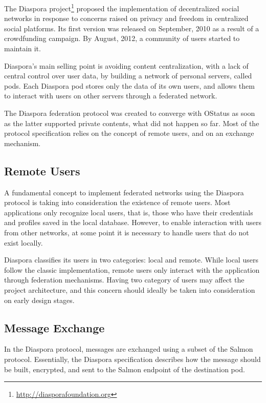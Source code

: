 The Diaspora project\footnote{\url{http://diasporafoundation.org}} proposed the
implementation of decentralized social networks in response to concerns raised
on privacy and freedom in centralized social platforms. Its first version was
released on September, 2010 as a result of a crowdfunding campaign. By August,
2012, a community of users started to maintain it.

Diaspora's main selling point is avoiding content centralization, with a lack
of central control over user data, by building a network of personal servers,
called pods. Each Diaspora pod stores only the data of its own users, and
allows them to interact with users on other servers through a federated
network.

The Diaspora federation protocol was created to converge with OStatus as
soon as the latter supported private contents, what did not happen so
far. Most of the protocol specification relies on the concept of remote
users, and on an exchange mechanism.

\subsection{Remote Users}

A fundamental concept to implement federated networks using the Diaspora
protocol is taking into consideration the existence of remote users.
Most applications only recognize local users, that is, those who have
their credentials and profiles saved in the local database. However, to
enable interaction with users from other networks, at some point it is
necessary to handle users that do not exist locally.

Diaspora classifies its users in two categories: local and remote. While
local users follow the classic implementation, remote users only
interact with the application through federation mechanisms. Having two
category of users may affect the project architecture, and this concern
should ideally be taken into consideration on early design stages.

\subsection{Message Exchange}

In the Diaspora protocol, messages are exchanged using a subset of the
Salmon protocol. Essentially, the Diaspora specification describes how
the message should be built, encrypted, and sent to the Salmon endpoint
of the destination pod.

